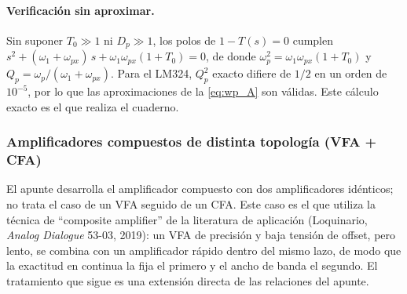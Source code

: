 \paragraph{Verificación sin aproximar.} Sin suponer $T_0 \gg 1$ ni $D_p \gg 1$, los polos de $1 - T(s) = 0$ cumplen $s^2 + (\omega_1 + \omega_{px})\,s + \omega_1\omega_{px}(1+T_0) = 0$, de donde $\omega_p^2 = \omega_1\omega_{px}(1+T_0)$ y $Q_p = \omega_p/(\omega_1+\omega_{px})$. Para el LM324, $Q_p^2$ exacto difiere de $1/2$ en un orden de $10^{-5}$, por lo que las aproximaciones de la \autoref{eq:wp_A} son válidas. Este cálculo exacto es el que realiza el cuaderno.


\subsubsection{Amplificadores compuestos de distinta topología (VFA + CFA)}
\label{sec:compuesto_distinto}

El apunte desarrolla el amplificador compuesto con dos amplificadores idénticos; no trata el caso de un VFA seguido de un CFA. Este caso es el que utiliza la técnica de ``composite amplifier'' de la literatura de aplicación (Loquinario, \emph{Analog Dialogue} 53-03, 2019): un VFA de precisión y baja tensión de offset, pero lento, se combina con un amplificador rápido dentro del mismo lazo, de modo que la exactitud en continua la fija el primero y el ancho de banda el segundo. El tratamiento que sigue es una extensión directa de las relaciones del apunte.

